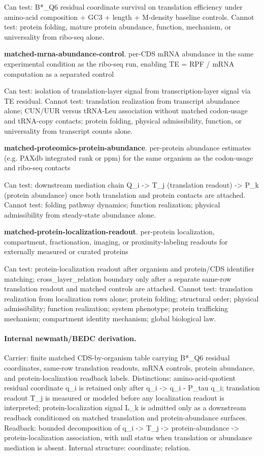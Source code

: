 Can test: B*\_Q6 residual coordinate survival on translation efficiency under amino-acid composition + GC3 + length + M-density baseline controls. Cannot test: protein folding, mature protein abundance, function, mechanism, or universality from ribo-seq alone.

\textbf{matched-mrna-abundance-control}. per-CDS mRNA abundance in the same experimental condition as the ribo-seq run, enabling TE = RPF / mRNA computation as a separated control

Can test: isolation of translation-layer signal from transcription-layer signal via TE residual. Cannot test: translation realization from transcript abundance alone; CUN/UUR versus tRNA-Leu association without matched codon-usage and tRNA-copy contacts; protein folding, physical admissibility, function, or universality from transcript counts alone.

\textbf{matched-proteomics-protein-abundance}. per-protein abundance estimates (e.g. PAXdb integrated rank or ppm) for the same organism as the codon-usage and ribo-seq contacts

Can test: downstream mediation chain Q\_i -> T\_j (translation readout) -> P\_k (protein abundance) once both translation and protein contacts are attached. Cannot test: folding pathway dynamics; function realization; physical admissibility from steady-state abundance alone.

\textbf{matched-protein-localization-readout}. per-protein localization, compartment, fractionation, imaging, or proximity-labeling readouts for externally measured or curated proteins

Can test: protein-localization readout after organism and protein/CDS identifier matching; cross\_layer\_relation boundary only after a separate same-row translation readout and matched controls are attached. Cannot test: translation realization from localization rows alone; protein folding; structural order; physical admissibility; function realization; system phenotype; protein trafficking mechanism; compartment identity mechanism; global biological law.

\paragraph{Internal newmath/BEDC derivation.} Carrier: finite matched CDS-by-organism table carrying B*\_Q6 residual coordinates, same-row translation readouts, mRNA controls, protein abundance, and protein-localization readback labels. Distinctions: amino-acid-quotient residual coordinate q\_i is retained only after q\_i -> q\_i - P\_tau q\_i; translation readout T\_j is measured or modeled before any localization readout is interpreted; protein-localization signal L\_k is admitted only as a downstream readback conditioned on matched translation and protein-abundance surfaces. Readback: bounded decomposition of q\_i -> T\_j -> protein-abundance -> protein-localization association, with null status when translation or abundance mediation is absent. Internal structure: coordinate; relation.

